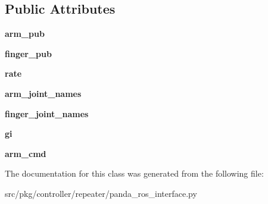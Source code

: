 \subsection*{Public Attributes}
\begin{DoxyCompactItemize}
\item 
\mbox{\label{classrnb-planning_1_1src_1_1pkg_1_1controller_1_1repeater_1_1panda__ros__interface_1_1_panda_control_publisher_a3d5bff0ba9aff032d9d6bd23ae79ab29}} 
{\bfseries arm\+\_\+pub}
\item 
\mbox{\label{classrnb-planning_1_1src_1_1pkg_1_1controller_1_1repeater_1_1panda__ros__interface_1_1_panda_control_publisher_adb218a82e7c8b3a514e7d8e64574b728}} 
{\bfseries finger\+\_\+pub}
\item 
\mbox{\label{classrnb-planning_1_1src_1_1pkg_1_1controller_1_1repeater_1_1panda__ros__interface_1_1_panda_control_publisher_a4a96974a8e537fb96d315b3de5e5d56b}} 
{\bfseries rate}
\item 
\mbox{\label{classrnb-planning_1_1src_1_1pkg_1_1controller_1_1repeater_1_1panda__ros__interface_1_1_panda_control_publisher_abd2923cad0cd2170f176176c61e8a218}} 
{\bfseries arm\+\_\+joint\+\_\+names}
\item 
\mbox{\label{classrnb-planning_1_1src_1_1pkg_1_1controller_1_1repeater_1_1panda__ros__interface_1_1_panda_control_publisher_a7a2709b0068734fb7ab25bae98afc2a9}} 
{\bfseries finger\+\_\+joint\+\_\+names}
\item 
\mbox{\label{classrnb-planning_1_1src_1_1pkg_1_1controller_1_1repeater_1_1panda__ros__interface_1_1_panda_control_publisher_a159c6d9d5f3aac0ee0700be2c548648a}} 
{\bfseries gi}
\item 
\mbox{\label{classrnb-planning_1_1src_1_1pkg_1_1controller_1_1repeater_1_1panda__ros__interface_1_1_panda_control_publisher_ab4493d08aff90911d40179b9d6e1a69b}} 
{\bfseries arm\+\_\+cmd}
\end{DoxyCompactItemize}


The documentation for this class was generated from the following file\+:\begin{DoxyCompactItemize}
\item 
src/pkg/controller/repeater/panda\+\_\+ros\+\_\+interface.\+py\end{DoxyCompactItemize}
